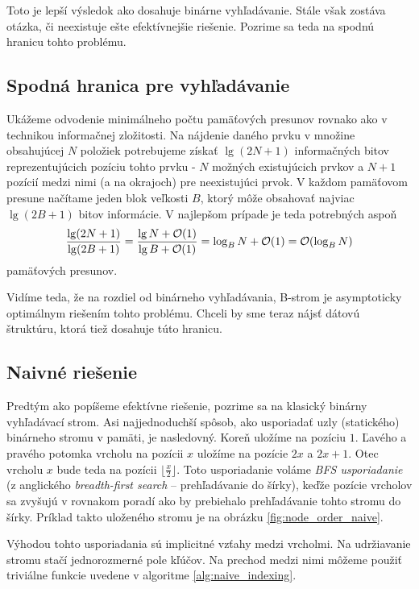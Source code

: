 Toto je lepší výsledok ako dosahuje binárne vyhľadávanie. Stále však zostáva otázka, či neexistuje  ešte efektívnejšie riešenie. Pozrime sa teda na spodnú hranicu tohto problému.

\subsection{Spodná hranica pre vyhľadávanie} \label{sec:tree-lowerbound}
Ukážeme odvodenie minimálneho počtu pamäťových presunov rovnako ako v \citep{demaineoverview} technikou informačnej zložitosti. Na nájdenie daného prvku v množine obsahujúcej $N$ položiek potrebujeme získať $\lg(2N+1)$ informačných bitov reprezentujúcich pozíciu tohto prvku - $N$ možných existujúcich prvkov a $N+1$ pozícií medzi nimi (a na okrajoch) pre neexistujúci prvok. V každom pamäťovom presune načítame jeden blok veľkosti $B$, ktorý môže obsahovať najviac $\lg(2B+1)$ bitov informácie. V najlepšom prípade je teda potrebných aspoň
\[
\frac{\lg(2N+1)}{\lg(2B+1)} = \frac{\lg N + \mathcal{O}(1)}{\lg B + \mathcal{O}(1)} = \log_B{N} + \mathcal{O}(1) = \mathcal{O}(\log_B{N})
\]
pamäťových presunov. 

Vidíme teda, že na rozdiel od \obliv binárneho vyhľadávania, \aware B-strom je asymptoticky optimálnym riešením tohto problému. Chceli by sme teraz nájsť \obliv dátovú štruktúru, ktorá tiež dosahuje túto hranicu.

\subsection{Naivné \obliv riešenie} \label{sec:static-naive}
Predtým ako popíšeme efektívne \obliv riešenie, pozrime sa na klasický binárny vyhľadávací strom. Asi najjednoduchší spôsob, ako usporiadať uzly (statického) binárneho stromu v pamäti, je nasledovný. Koreň uložíme na pozíciu $1$. Ľavého a pravého potomka vrcholu na pozícii $x$ uložíme na pozície $2x$ a $2x+1$. Otec vrcholu $x$ bude teda na pozícii $\lfloor\frac{x}{2}\rfloor$. Toto usporiadanie voláme \emph{BFS usporiadanie} (z anglického \emph{breadth-first search} -- prehľadávanie do šírky), keďže pozície vrcholov sa zvyšujú v rovnakom poradí ako by prebiehalo prehľadávanie tohto stromu do šírky. Príklad takto uloženého stromu je na obrázku \ref{fig:node_order_naive}.

Výhodou tohto usporiadania sú implicitné vzťahy medzi vrcholmi. Na udržiavanie stromu stačí jednorozmerné pole kľúčov. Na prechod medzi nimi môžeme použiť triviálne funkcie uvedene v algoritme \ref{alg:naive_indexing}.

